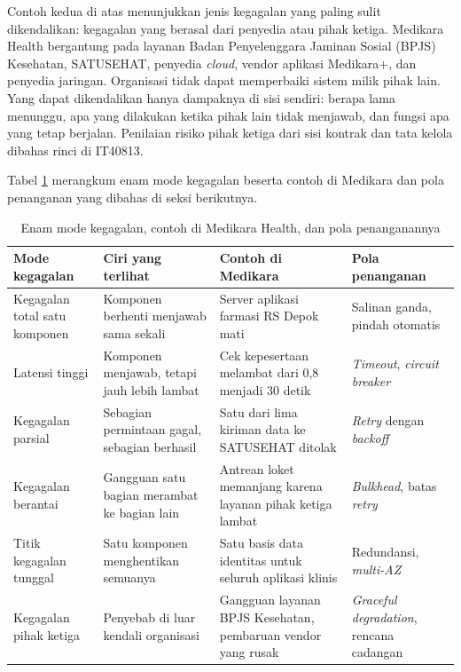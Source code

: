 Contoh kedua di atas menunjukkan jenis kegagalan yang paling sulit dikendalikan: kegagalan yang
berasal dari penyedia atau pihak ketiga. Medikara Health bergantung pada layanan Badan
Penyelenggara Jaminan Sosial (BPJS) Kesehatan, SATUSEHAT, penyedia \textit{cloud}, vendor aplikasi
Medikara+, dan penyedia jaringan. Organisasi tidak dapat memperbaiki sistem milik pihak lain. Yang
dapat dikendalikan hanya dampaknya di sisi sendiri: berapa lama menunggu, apa yang dilakukan ketika
pihak lain tidak menjawab, dan fungsi apa yang tetap berjalan. Penilaian risiko pihak ketiga dari
sisi kontrak dan tata kelola dibahas rinci di IT40813.

Tabel \ref{tab:ch12-mode-kegagalan} merangkum enam mode kegagalan beserta contoh di Medikara dan pola
penanganan yang dibahas di seksi berikutnya.

\begin{table}[!htb]
  \centering
  \caption{Enam mode kegagalan, contoh di Medikara Health, dan pola penanganannya}
  \label{tab:ch12-mode-kegagalan}
  \footnotesize
  \begin{tabularx}{\textwidth}{>{\raggedright\arraybackslash}p{2.3cm} >{\raggedright\arraybackslash}X >{\raggedright\arraybackslash}X >{\raggedright\arraybackslash}p{2.5cm}}
    \hline
    \textbf{Mode kegagalan} & \textbf{Ciri yang terlihat} & \textbf{Contoh di Medikara} &
      \textbf{Pola penanganan} \\ \hline
    Kegagalan total satu komponen & Komponen berhenti menjawab sama sekali & Server aplikasi
      farmasi RS Depok mati & Salinan ganda, pindah otomatis \\ \hline
    Latensi tinggi & Komponen menjawab, tetapi jauh lebih lambat & Cek kepesertaan melambat dari
      0,8 menjadi 30 detik & \textit{Timeout}, \textit{circuit breaker} \\ \hline
    Kegagalan parsial & Sebagian permintaan gagal, sebagian berhasil & Satu dari lima kiriman
      data ke SATUSEHAT ditolak & \textit{Retry} dengan \textit{backoff} \\ \hline
    Kegagalan berantai & Gangguan satu bagian merambat ke bagian lain & Antrean loket memanjang
      karena layanan pihak ketiga lambat & \textit{Bulkhead}, batas \textit{retry} \\ \hline
    Titik kegagalan tunggal & Satu komponen menghentikan semuanya & Satu basis data identitas
      untuk seluruh aplikasi klinis & Redundansi, \textit{multi-AZ} \\ \hline
    Kegagalan pihak ketiga & Penyebab di luar kendali organisasi & Gangguan layanan BPJS
      Kesehatan, pembaruan vendor yang rusak & \textit{Graceful degradation}, rencana cadangan
      \\ \hline
  \end{tabularx}
\end{table}

